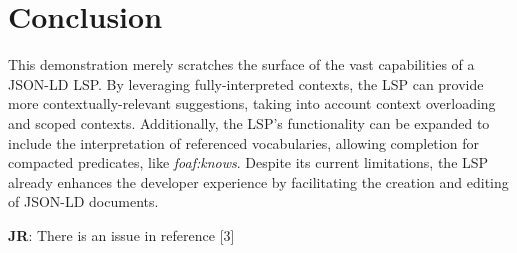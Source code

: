 \documentclass[
]{ceurart}
\newcommand\jr[1]{{\color{Red}\textbf{JR}: #1}}
\begin{document}
\section{Conclusion}

This demonstration merely scratches the surface of the vast capabilities of a JSON-LD LSP. By leveraging fully-interpreted contexts, the LSP can provide more contextually-relevant suggestions, taking into account context overloading and scoped contexts. Additionally, the LSP's functionality can be expanded to include the interpretation of referenced vocabularies, allowing completion for compacted predicates, like \textit{foaf:knows}. Despite its current limitations, the LSP already enhances the developer experience by facilitating the creation and editing of JSON-LD documents.


\jr{There is an issue in reference [3]}

\end{document}
